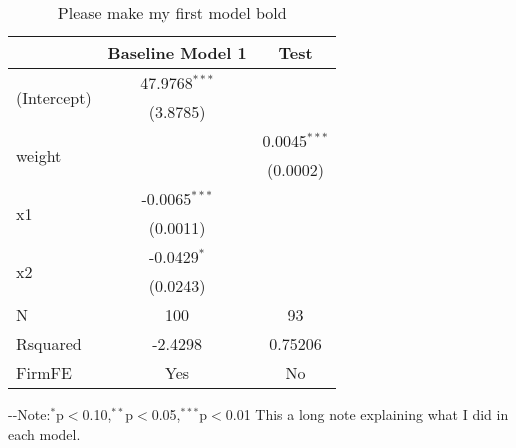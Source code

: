 \begin{table}[H] 
\centering 
\caption{Please make my first model bold} 
\label{tab:myLabel}
\begin{threeparttable}
\begin{tabular}{lcc}
\toprule 
& \textbf{Baseline Model} 1 & Test \\ 
\midrule 
\multirow{2}{*}{(Intercept)}&47.9768$^{***}$ &  \\ 
& (3.8785) &  \\ 
\multirow{2}{*}{weight}& &0.0045$^{***}$ \\ 
&  &(0.0002) \\ 
\multirow{2}{*}{x1}&-0.0065$^{***}$ &  \\ 
& (0.0011) &  \\ 
\multirow{2}{*}{x2}&-0.0429$^{*}$ &  \\ 
& (0.0243) &  \\ 
\midrule 
N & 100 & 93 \\ 
Rsquared & -2.4298 & 0.75206 \\ 
FirmFE & Yes & No \\ 
\bottomrule 
\end{tabular} 
\begin{tablenotes} 
\scriptsize 
\item \leavevmode\kern-\scriptspace\kern- Note:$^{*}$p$<$0.10,$^{**}$p$<$0.05,$^{***}$p$<$0.01 This a long note explaining what I did in each model. 
\end{tablenotes}
\end{threeparttable} 
\end{table} 
 